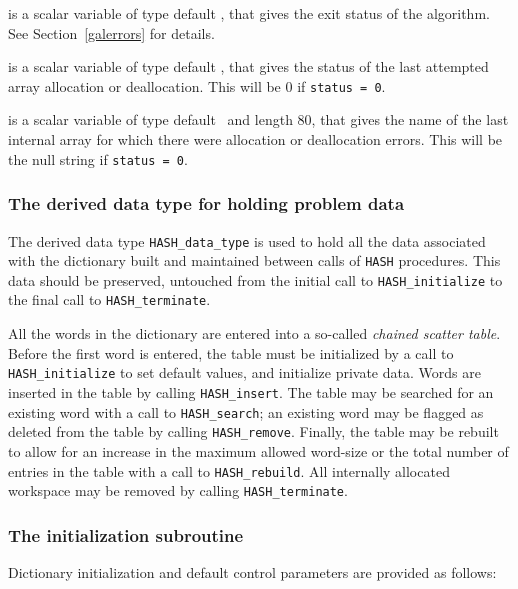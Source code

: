 \documentclass{galahad}
\newcommand{\packagename}{HASH}
\begin{document}
\begin{description}
 is a scalar variable of type default \integer, that gives the
exit status of the algorithm.
See Section~\ref{galerrors} for details.

 is a scalar variable of type default \integer, that gives
the status of the last attempted array allocation or deallocation.
This will be 0 if {\tt status = 0}.

 is a scalar variable of type default \character\
and length 80, that  gives the name of the last internal array
for which there were allocation or deallocation errors.
This will be the null string if {\tt status = 0}.

\end{description}


\subsubsection{The derived data type for holding problem data}\label{typedata}
The derived data type
{\tt \packagename\_data\_type}
is used to hold all the data associated with the dictionary built
and maintained between calls of {\tt \packagename} procedures.
This data should be preserved, untouched
from the initial call to
{\tt \packagename\_initialize}
to the final call to
{\tt \packagename\_terminate}.


\galarguments
All the words in the dictionary are entered into a so-called
{\em chained scatter table}. Before the first word is entered, the
table must be initialized by a call to {\tt \packagename\_initialize}
to set default values, and initialize private data.
Words are inserted in the table by calling {\tt \packagename\_insert}.
The table may be searched for an existing word with a call to
{\tt \packagename\_search}; an existing word may be flagged as deleted
from the table by calling {\tt \packagename\_remove}.
Finally, the table may be rebuilt to
allow for an increase in the maximum allowed word-size or the total
number of entries in the table with a call to {\tt \packagename\_rebuild}.
All internally allocated workspace may be removed by calling
{\tt \packagename\_terminate}.


\subsubsection{The initialization subroutine}\label{subinit}
Dictionary initialization and default control parameters
are provided as follows:
\vspace*{1mm}
\end{document}
